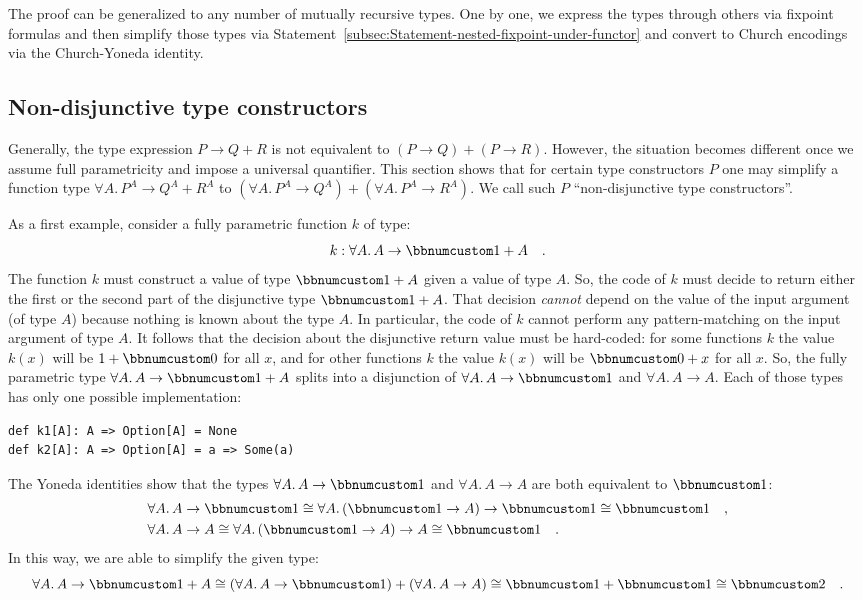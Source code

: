 The proof can be generalized to any number of mutually recursive types.
One by one, we express the types through others via fixpoint formulas
and then simplify those types via Statement~\ref{subsec:Statement-nested-fixpoint-under-functor}
and convert to Church encodings via the Church-Yoneda identity.

\subsection{Non-disjunctive type constructors}

Generally, the type expression $P\rightarrow Q+R$ is not equivalent
to $(P\rightarrow Q)+(P\rightarrow R)$. However, the situation becomes
different once we assume full parametricity and impose a universal
quantifier. This section shows that for certain type constructors
$P$ one may simplify a function type $\forall A.\,P^{A}\rightarrow Q^{A}+R^{A}$
to $(\forall A.\,P^{A}\rightarrow Q^{A})+(\forall A.\,P^{A}\rightarrow R^{A})$.
We call such $P$ \textsf{``}non-disjunctive type constructors\textsf{''}.

As a first example, consider a fully parametric function $k$ of type:
\[
k:\forall A.\,A\rightarrow\bbnum 1+A\quad.
\]
The function $k$ must construct a value of type $\bbnum 1+A$ given
a value of type $A$. So, the code of $k$ must decide to return either
the first or the second part of the disjunctive type $\bbnum 1+A$.
That decision \emph{cannot} depend on the value of the input argument
(of type $A$) because nothing is known about the type $A$. In particular,
the code of $k$ cannot perform any pattern-matching on the input
argument of type $A$. It follows that the decision about the disjunctive
return value must be hard-coded: for some functions $k$ the value
$k(x)$ will be $1+\bbnum 0$ for all $x$, and for other functions
$k$ the value $k(x)$ will be $\bbnum 0+x$ for all $x$. So, the
fully parametric type $\forall A.\,A\rightarrow\bbnum 1+A$ splits
into a disjunction of $\forall A.\,A\rightarrow\bbnum 1$ and $\forall A.\,A\rightarrow A$.
Each of those types has only one possible implementation:
\begin{lstlisting}
def k1[A]: A => Option[A] = None
def k2[A]: A => Option[A] = a => Some(a)
\end{lstlisting}
The Yoneda identities show that the types $\forall A.\,A\rightarrow\bbnum 1$
and $\forall A.\,A\rightarrow A$ are both equivalent to $\bbnum 1$:
\begin{align*}
 & \forall A.\,A\rightarrow\bbnum 1\cong\forall A.\,(\bbnum 1\rightarrow A)\rightarrow\bbnum 1\cong\bbnum 1\quad,\\
 & \forall A.\,A\rightarrow A\cong\forall A.\,(\bbnum 1\rightarrow A)\rightarrow A\cong\bbnum 1\quad.
\end{align*}
In this way, we are able to simplify the given type:
\[
\forall A.\,A\rightarrow\bbnum 1+A\cong(\forall A.\,A\rightarrow\bbnum 1)+(\forall A.\,A\rightarrow A)\cong\bbnum 1+\bbnum 1\cong\bbnum 2\quad.
\]

